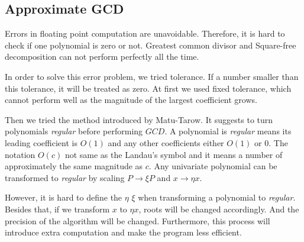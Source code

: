 



\subsection{Approximate GCD}

Errors in floating point computation are unavoidable. Therefore, it is hard to
check if one polynomial is zero or not. Greatest common divisor and Square-free
decomposition can not perform perfectly all the time.

In order to solve this error problem, we tried tolerance. If a number
smaller than this tolerance, it will be treated as zero. At first we used fixed
tolerance, which cannot perform well as the magnitude of the largest coefficient
grows.

Then we tried the method introduced by Matu-Tarow\cite{Approximate}. It suggests
to turn polynomials \textit{regular} before performing $GCD$. A polynomial is
\textit{regular} means its leading coefficient is $O(1)$ and any other
coefficients either $O(1)$ or $0$. The notation $O(c)$ not same as the Landau’s
symbol and it means a number of approximately the same magnitude as $c$. Any
univariate polynomial can be transformed to \textit{regular} by scaling
$P\rightarrow \xi P $ and $x \rightarrow  \eta x$. 

However, it is hard to define the $\eta$ $\xi$ when transforming a
polynomial to \textit{regular}. Besides that, if we transform $x$ to $\eta x$,
roots will be changed accordingly. And the precision of the algorithm will be
changed. Furthermore, this process will introduce extra computation and make the
program less efficient.

